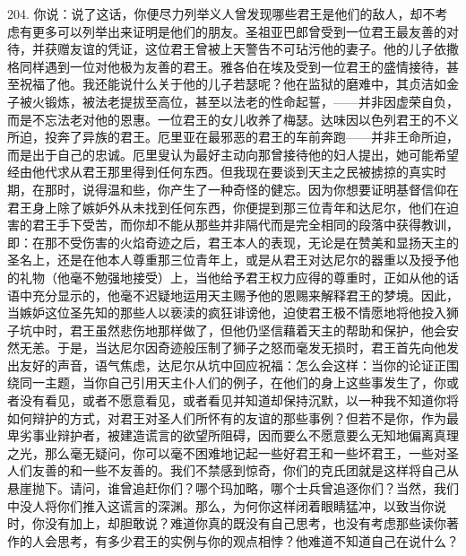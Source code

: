 204. 你说：说了这话，你便尽力列举义人曾发现哪些君王是他们的敌人，却不考虑有更多可以列举出来证明是他们的朋友。圣祖亚巴郎曾受到一位君王最友善的对待，并获赠友谊的凭证，这位君王曾被上天警告不可玷污他的妻子。他的儿子依撒格同样遇到一位对他极为友善的君王。雅各伯在埃及受到一位君王的盛情接待，甚至祝福了他。我还能说什么关于他的儿子若瑟呢？他在监狱的磨难中，其贞洁如金子被火锻炼，被法老提拔至高位，甚至以法老的性命起誓，——并非因虚荣自负，而是不忘法老对他的恩惠。一位君王的女儿收养了梅瑟。达味因以色列君王的不义所迫，投奔了异族的君王。厄里亚在最邪恶的君王的车前奔跑——并非王命所迫，而是出于自己的忠诚。厄里叟认为最好主动向那曾接待他的妇人提出，她可能希望经由他代求从君王那里得到任何东西。但我现在要谈到天主之民被掳掠的真实时期，在那时，说得温和些，你产生了一种奇怪的健忘。因为你想要证明基督信仰在君王身上除了嫉妒外从未找到任何东西，你便提到那三位青年和达尼尔，他们在迫害的君王手下受苦，而你却不能从那些并非隔代而是完全相同的段落中获得教训，即：在那不受伤害的火焰奇迹之后，君王本人的表现，无论是在赞美和显扬天主的圣名上，还是在他本人尊重那三位青年上，或是从君王对达尼尔的器重以及授予他的礼物（他毫不勉强地接受）上，当他给予君王权力应得的尊重时，正如从他的话语中充分显示的，他毫不迟疑地运用天主赐予他的恩赐来解释君王的梦境。因此，当嫉妒这位圣先知的那些人以亵渎的疯狂诽谤他，迫使君王极不情愿地将他投入狮子坑中时，君王虽然悲伤地那样做了，但他仍坚信藉着天主的帮助和保护，他会安然无恙。于是，当达尼尔因奇迹般压制了狮子之怒而毫发无损时，君王首先向他发出友好的声音，语气焦虑，达尼尔从坑中回应祝福：怎么会这样：当你的论证正围绕同一主题，当你自己引用天主仆人们的例子，在他们的身上这些事发生了，你或者没有看见，或者不愿意看见，或者看见并知道却保持沉默，以一种我不知道你将如何辩护的方式，对君王对圣人们所怀有的友谊的那些事例？但若不是你，作为最卑劣事业辩护者，被建造谎言的欲望所阻碍，因而要么不愿意要么无知地偏离真理之光，那么毫无疑问，你可以毫不困难地记起一些好君王和一些坏君王，一些对圣人们友善的和一些不友善的。我们不禁感到惊奇，你们的克氏团就是这样将自己从悬崖抛下。请问，谁曾追赶你们？哪个玛加略，哪个士兵曾追逐你们？当然，我们中没人将你们推入这谎言的深渊。那么，为何你这样闭着眼睛猛冲，以致当你说时，你没有加上，却胆敢说？难道你真的既没有自己思考，也没有考虑那些读你著作的人会思考，有多少君王的实例与你的观点相悖？他难道不知道自己在说什么？\par

